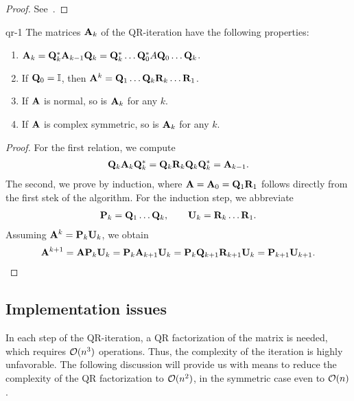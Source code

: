 \begin{proof}
  See~\cite[Theorem 7.3-1]{GolubVanLoan83}.
\end{proof}

\begin{Lemma}{qr-1}
  The matrices $\mathbf A_k$ of the QR-iteration have the following properties:
  \begin{enumerate}
  \item $\mathbf A_{k} = \mathbf Q_k^*\mathbf A_{k-1}\mathbf Q_k = \mathbf Q_k^*\dots\mathbf Q_0^*A\mathbf Q_0\dots\mathbf Q_k$.
  \item If $\mathbf Q_0=\mathbb I$, then $\mathbf A^k=\mathbf Q_1\dots\mathbf Q_k\mathbf R_k\dots\mathbf R_1$.
  \item If $\mathbf A$ is normal, so is $\mathbf A_k$ for any $k$.
  \item If $\mathbf A$ is complex symmetric, so is $\mathbf A_k$ for any $k$.
  \end{enumerate}
\end{Lemma}

\begin{proof}
  For the first relation, we compute
  \begin{gather}
    \mathbf Q_k\mathbf A_{k}\mathbf Q_k^* = \mathbf Q_k\mathbf R_k\mathbf Q_k\mathbf Q_k^* = \mathbf A_{k-1}.
  \end{gather}
  The second, we prove by induction, where
  $\mathbf A = \mathbf A_0 = \mathbf Q_1\mathbf R_1$ follows directly from the first
  stek of the algorithm. For the induction step, we abbreviate
  \begin{gather}
    \mathbf P_k = \mathbf Q_1\dots\mathbf Q_k,\qquad \mathbf U_k = \mathbf R_k\dots\mathbf R_1.
  \end{gather}
  Assuming $\mathbf A^k = \mathbf P_k\mathbf U_k$, we obtain
  \begin{gather}
    \mathbf A^{k+1} = \mathbf A\mathbf P_k\mathbf U_k = \mathbf P_k\mathbf A_{k+1}\mathbf U_k
    = \mathbf P_k\mathbf Q_{k+1}\mathbf R_{k+1}\mathbf U_k = \mathbf P_{k+1}\mathbf U_{k+1}.
  \end{gather}
\end{proof}
\subsection{Implementation issues}
\begin{intro}
  In each step of the QR-iteration, a QR factorization of the matrix
  is needed, which requires $\mathcal O(n^3)$ operations. Thus, the
  complexity of the iteration is highly unfavorable. The following
  discussion will provide us with means to reduce the complexity of
  the QR factorization to $\mathcal O(n^2)$, in the symmetric case even to
  $\mathcal O(n)$.
\end{intro}

